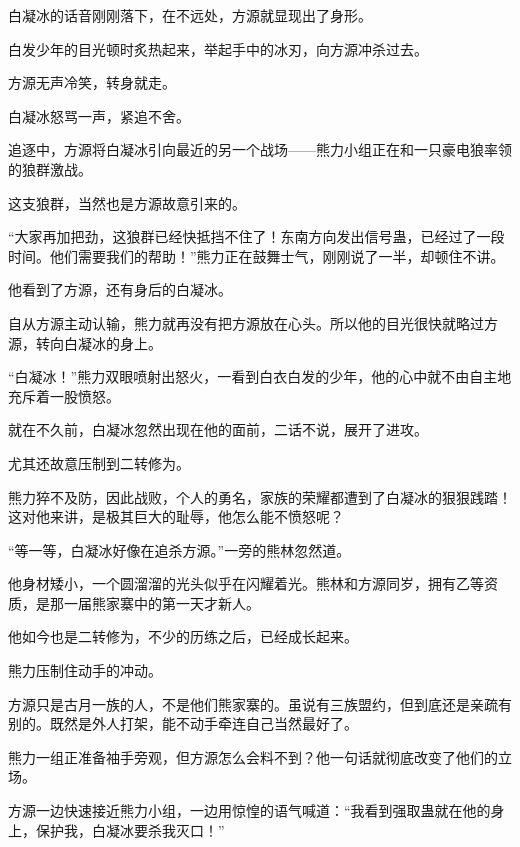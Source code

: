 \begin{this_body}
白凝冰的话音刚刚落下，在不远处，方源就显现出了身形。

白发少年的目光顿时炙热起来，举起手中的冰刃，向方源冲杀过去。

方源无声冷笑，转身就走。

白凝冰怒骂一声，紧追不舍。

追逐中，方源将白凝冰引向最近的另一个战场——熊力小组正在和一只豪电狼率领的狼群激战。

这支狼群，当然也是方源故意引来的。

“大家再加把劲，这狼群已经快抵挡不住了！东南方向发出信号蛊，已经过了一段时间。他们需要我们的帮助！”熊力正在鼓舞士气，刚刚说了一半，却顿住不讲。

他看到了方源，还有身后的白凝冰。

自从方源主动认输，熊力就再没有把方源放在心头。所以他的目光很快就略过方源，转向白凝冰的身上。

“白凝冰！”熊力双眼喷射出怒火，一看到白衣白发的少年，他的心中就不由自主地充斥着一股愤怒。

就在不久前，白凝冰忽然出现在他的面前，二话不说，展开了进攻。

尤其还故意压制到二转修为。

熊力猝不及防，因此战败，个人的勇名，家族的荣耀都遭到了白凝冰的狠狠践踏！这对他来讲，是极其巨大的耻辱，他怎么能不愤怒呢？

“等一等，白凝冰好像在追杀方源。”一旁的熊林忽然道。

他身材矮小，一个圆溜溜的光头似乎在闪耀着光。熊林和方源同岁，拥有乙等资质，是那一届熊家寨中的第一天才新人。

他如今也是二转修为，不少的历练之后，已经成长起来。

熊力压制住动手的冲动。

方源只是古月一族的人，不是他们熊家寨的。虽说有三族盟约，但到底还是亲疏有别的。既然是外人打架，能不动手牵连自己当然最好了。

熊力一组正准备袖手旁观，但方源怎么会料不到？他一句话就彻底改变了他们的立场。

方源一边快速接近熊力小组，一边用惊惶的语气喊道：“我看到强取蛊就在他的身上，保护我，白凝冰要杀我灭口！”

\end{this_body}

